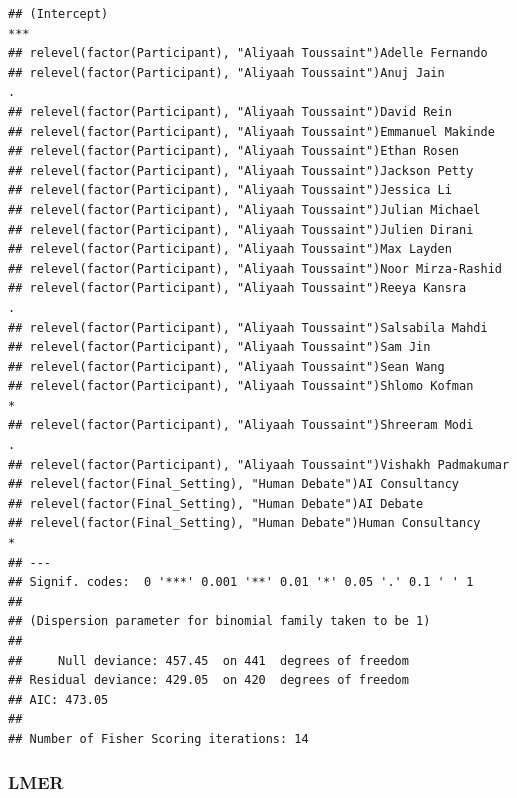 \documentclass[
]{article}
\newenvironment{Shaded}{\begin{snugshade}}{\end{snugshade}}
\newcommand{\AttributeTok}[1]{\textcolor[rgb]{0.77,0.63,0.00}{#1}}
\newcommand{\ConstantTok}[1]{\textcolor[rgb]{0.00,0.00,0.00}{#1}}
\newcommand{\DecValTok}[1]{\textcolor[rgb]{0.00,0.00,0.81}{#1}}
\newcommand{\FunctionTok}[1]{\textcolor[rgb]{0.00,0.00,0.00}{#1}}
\newcommand{\NormalTok}[1]{#1}
\newcommand{\OtherTok}[1]{\textcolor[rgb]{0.56,0.35,0.01}{#1}}
\newcommand{\SpecialCharTok}[1]{\textcolor[rgb]{0.00,0.00,0.00}{#1}}
\newcommand{\StringTok}[1]{\textcolor[rgb]{0.31,0.60,0.02}{#1}}
\begin{document}
\begin{verbatim}
## (Intercept)                                                         ***
## relevel(factor(Participant), "Aliyaah Toussaint")Adelle Fernando       
## relevel(factor(Participant), "Aliyaah Toussaint")Anuj Jain          .  
## relevel(factor(Participant), "Aliyaah Toussaint")David Rein            
## relevel(factor(Participant), "Aliyaah Toussaint")Emmanuel Makinde      
## relevel(factor(Participant), "Aliyaah Toussaint")Ethan Rosen           
## relevel(factor(Participant), "Aliyaah Toussaint")Jackson Petty         
## relevel(factor(Participant), "Aliyaah Toussaint")Jessica Li            
## relevel(factor(Participant), "Aliyaah Toussaint")Julian Michael        
## relevel(factor(Participant), "Aliyaah Toussaint")Julien Dirani         
## relevel(factor(Participant), "Aliyaah Toussaint")Max Layden            
## relevel(factor(Participant), "Aliyaah Toussaint")Noor Mirza-Rashid     
## relevel(factor(Participant), "Aliyaah Toussaint")Reeya Kansra       .  
## relevel(factor(Participant), "Aliyaah Toussaint")Salsabila Mahdi       
## relevel(factor(Participant), "Aliyaah Toussaint")Sam Jin               
## relevel(factor(Participant), "Aliyaah Toussaint")Sean Wang             
## relevel(factor(Participant), "Aliyaah Toussaint")Shlomo Kofman      *  
## relevel(factor(Participant), "Aliyaah Toussaint")Shreeram Modi      .  
## relevel(factor(Participant), "Aliyaah Toussaint")Vishakh Padmakumar    
## relevel(factor(Final_Setting), "Human Debate")AI Consultancy           
## relevel(factor(Final_Setting), "Human Debate")AI Debate                
## relevel(factor(Final_Setting), "Human Debate")Human Consultancy     *  
## ---
## Signif. codes:  0 '***' 0.001 '**' 0.01 '*' 0.05 '.' 0.1 ' ' 1
## 
## (Dispersion parameter for binomial family taken to be 1)
## 
##     Null deviance: 457.45  on 441  degrees of freedom
## Residual deviance: 429.05  on 420  degrees of freedom
## AIC: 473.05
## 
## Number of Fisher Scoring iterations: 14
\end{verbatim}

\hypertarget{lmer}{%
\subsubsection{LMER}\label{lmer}}

\begin{Shaded}
\end{Shaded}
\end{document}
